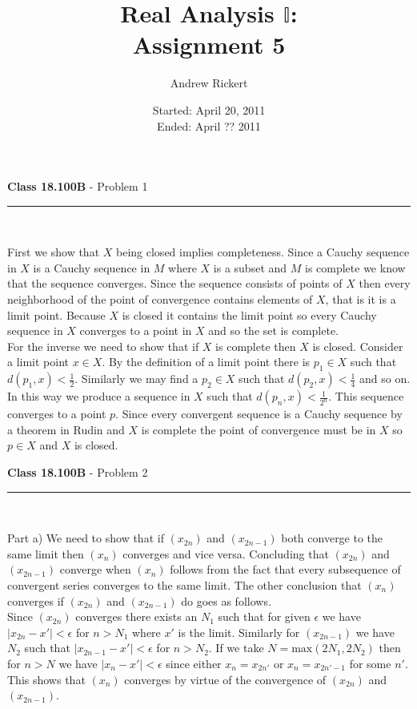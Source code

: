 \documentclass[11pt,reqno]{article}
\title{Real Analysis $\mathbb{I}$: \\ Assignment 5}
\author{Andrew Rickert}
\date{Started: April 20, 2011 \\ \hspace{1pt} Ended: April ??  2011}                                           %
\begin{document}
\maketitle


\begin{flushleft} 
\textbf{Class 18.100B} - Problem 1\\
\rule{500pt}{1pt}\\
\end{flushleft} 

First we show that $X$ being closed implies completeness. Since a Cauchy sequence in $X$ is a Cauchy sequence in $M$ where $X$ is a subset and $M$ is complete we know that the sequence converges. Since the sequence consists of points of $X$ then every neighborhood of the point of convergence contains elements of $X$, that is it is a limit point. Because $X$ is closed it contains the limit point so every Cauchy sequence in $X$ converges to a point in $X$ and so the set is complete.\\
\indent For the inverse we need to show that if $X$ is complete then $X$ is closed. Consider a limit point $x \in X$. By the definition of a limit point there is $p_1 \in X$ such that $d(p_1,x) < \frac{1}{2}$. Similarly we may find a $p_2 \in X$ such that $d(p_2,x) < \frac{1}{4}$ and so on. In this way we produce a sequence in $X$ such that $d(p_n,x) < \frac{1}{2^n}$. This sequence converges to a point $p$. Since every convergent sequence is a Cauchy sequence by a theorem in Rudin and $X$ is complete the point of convergence must be in $X$ so $p \in X$ and $X$ is closed.

\vspace{15pt}
\begin{flushleft} 
\textbf{Class 18.100B} - Problem 2\\
\rule{500pt}{1pt}\\
\end{flushleft} 

\noindent Part a) We need to show that if $(x_{2n})$ and $(x_{2n-1})$ both converge to the same limit then $(x_n)$ converges and vice versa. Concluding that $(x_{2n})$ and $(x_{2n-1})$ converge when $(x_n)$ follows from the fact that every subsequence of convergent series converges to the same limit. The other conclusion that $(x_n)$ converges if $(x_{2n})$ and $(x_{2n-1})$ do goes as follows.\\
\indent Since $(x_{2n})$ converges there exists an $N_1$ such that for given $\epsilon$ we have $|x_{2n}-x'| < \epsilon$ for $n > N_1$ where $x'$ is the limit. Similarly for $(x_{2n-1})$ we have $N_2$ such that  $|x_{2n-1}-x'| < \epsilon$ for $n > N_2$. If we take $N = \text{max} (2N_1,2N_2)$ then for $n > N$ we have $|x_n -x'| < \epsilon$ since either $x_n = x_{2n'}$ or $x_n = x_{2n'-1}$ for some $n'$. This shows that $(x_n)$ converges by virtue of the convergence of $(x_{2n})$ and $(x_{2n-1})$.\\
\end{document}

